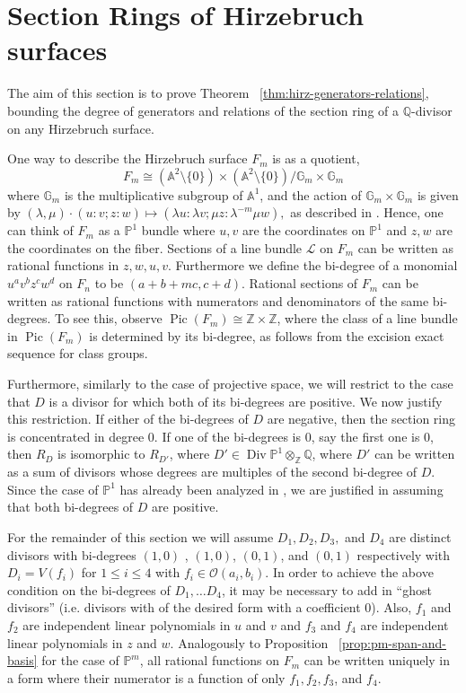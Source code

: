 \documentclass{amsart}
\theoremstyle{plain}
\theoremstyle{definition}
\theoremstyle{remark}
\numberwithin{equation}{section}
\newcommand\bq{{\mathbb Q}}
\newcommand\bp{{\mathbb P}}
\newcommand\bz{{\mathbb Z}}
\newcommand\ba{{\mathbb A}}
\newcommand\sco{{\mathscr O}}
\DeclareMathOperator\di{Div}
\newcommand\bida{a}
\newcommand\bidb{b}
\newcommand\hirz{F}
\DeclareMathOperator{\Pic}{Pic}
\newcommand\invisiblesubsection{%
  \refstepcounter{subsection}%
}
\begin{document}
\section{Section Rings of Hirzebruch surfaces}
\label{sec:hirz}
\invisiblesubsection
The aim of this section is to prove Theorem
~\ref{thm:hirz-generators-relations}, bounding the degree of
generators and relations of the section ring of a $\bq$-divisor
on any Hirzebruch surface.

One way to describe the Hirzebruch surface $\hirz_m$ is as a
quotient,
\[
\hirz_m \cong (\ba^2 \setminus \{0\}) \times (\ba^2 \setminus \{0\})/\mathbb G_m \times \mathbb G_m
\]
where $\mathbb G_m$ is the multiplicative subgroup of $\ba^1$, and the action of $\mathbb G_m \times \mathbb G_m$ is given by
$(\lambda, \mu) \cdot (u\colon v; z\colon w) \mapsto (\lambda u\colon \lambda v; \mu z\colon \lambda^{-m} \mu w),$ as described in \cite[p.~ 6]{zhao:counting-cubic}. Hence, one can think of
$\hirz_m$ as a $\bp^1$ bundle where $u,v$ are the coordinates on
$\bp^1$ and $z,w$ are the coordinates on the fiber.
Sections of a line bundle $\mathscr L$ on $\hirz_m$ can be written as
rational functions in $z, w, u, v$.
Furthermore we define the bi-degree of a monomial $u^a v^{b} z^c w^d$
on $\hirz_n$ to be
$(a + b + mc, c + d)$. Rational sections of $\hirz_m$ can be written as
rational functions with numerators and denominators of the same bi-degrees. To see this, 
observe
$\Pic(\hirz_m) \cong \bz \times \bz$, where the class of a line bundle
in $\Pic(\hirz_m)$
is determined by its bi-degree, as follows from the excision exact sequence
for class groups.

Furthermore, similarly to the case of projective space, 
we will restrict to the case that $D$ is a divisor
for which both of its bi-degrees are positive. We now justify this
restriction. If either of the bi-degrees of $D$ are negative,
then the section ring is concentrated in degree 0. If one of the
bi-degrees is 0, say the first one is 0, then $R_D$ is isomorphic
to $R_{D'}$, where $D' \in \di \bp^1 \otimes_\bz \bq$, 
where $D'$ can be written as a sum of divisors whose degrees
are multiples of the second bi-degree of $D$. Since the case of
$\bp^1$ has already been analyzed in \cite{dorney:canonical}, we
are justified in assuming that both bi-degrees of $D$ are positive.


For the remainder of this section we will assume $D_1, D_2, D_3,$ and $D_4$ are
distinct divisors with bi-degrees $(1,0)$
, $(1,0)$, $(0,1)$, and $(0,1)$ respectively with $D_i = V(f_i)$ for $1 \leq i \leq 4$ with $f_i \in \sco(\bida_i, \bidb_i)$.  
In order to achieve the above condition on the bi-degrees of
$D_1, \ldots D_4$, it may be necessary to add in ``ghost divisors'' (i.e.
divisors with of the desired form with a coefficient $0$).
Also, $f_1$ and $f_2$ are independent linear
polynomials in $u$ and $v$ and $f_3$ and $f_4$ are independent
linear polynomials in $z$ and $w$.
Analogously to Proposition ~\ref{prop:pm-span-and-basis} for the case
of $\bp^m$, all rational functions on $\hirz_m$
can be written uniquely in a form where their numerator is a function
of only $f_1,f_2,f_3$, and $f_4$.
\end{document}
